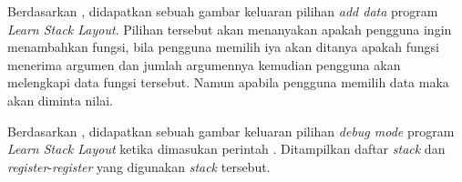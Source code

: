 \documentclass[../main.tex]{subfiles}
\begin{document}
\begin{indentpar}
    \hspace{\parindent}Berdasarkan , didapatkan sebuah gambar keluaran pilihan \textit{add data} program \textit{Learn Stack Layout}. Pilihan tersebut akan menanyakan apakah pengguna ingin menambahkan fungsi, bila pengguna memilih iya akan ditanya apakah fungsi menerima argumen dan jumlah argumennya kemudian pengguna akan melengkapi data fungsi tersebut. Namun apabila pengguna memilih data maka akan diminta nilai.
\end{indentpar}
\blanktop
{}
\begin{indentpar}
    \hspace{\parindent}Berdasarkan , didapatkan sebuah gambar keluaran pilihan \textit{debug mode} program \textit{Learn Stack Layout} ketika dimasukan perintah . Ditampilkan daftar \textit{stack} dan \textit{register}-\textit{register} yang digunakan \textit{stack} tersebut.
\end{indentpar}

\end{document}
